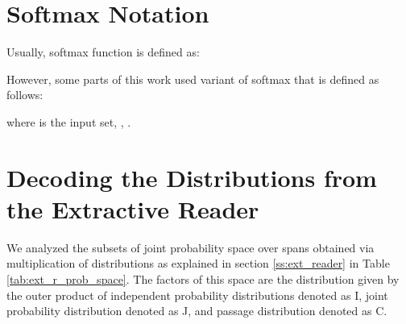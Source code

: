 \documentclass[11pt]{article}
\begin{document}
\section{Softmax Notation}
\label{app:softmax_not}
Usually, softmax function  is  defined as:



However, some parts of this work used variant of softmax that is defined as follows:

where  is the input set, , .

\section{Decoding the Distributions from the Extractive Reader}
\label{app:decoding_ext_probs}
We analyzed the subsets of joint probability space over spans obtained via multiplication of distributions as explained in section \ref{ss:ext_reader} in Table \ref{tab:ext_r_prob_space}. The factors of this space are the distribution given by the outer product of independent probability distributions  denoted as I, joint probability distribution  denoted as J, and passage distribution  denoted as C.
\begin{table}[H]

    \caption{The results of the pipeline with different types of extractive reader's distribution used for decoding. See text for details.}
    \label{tab:ext_r_prob_space}
\end{table}
\end{document}
